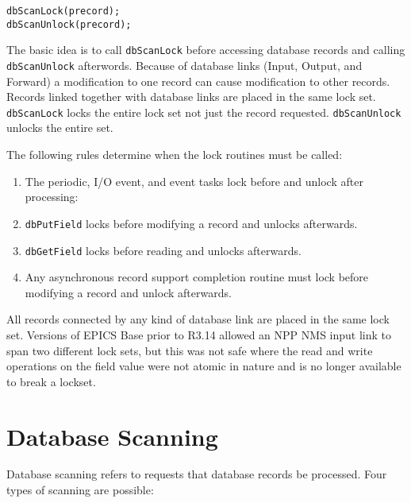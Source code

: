 \begin{verbatim}
dbScanLock(precord);
dbScanUnlock(precord);
\end{verbatim}

The basic idea is to call \verb|dbScanLock| before accessing database records and calling \verb|dbScanUnlock| afterwords. 
Because of database links (Input, Output, and Forward) a modification to one record can cause modification to other 
records. Records linked together with database links are placed in the same lock set. \verb|dbScanLock| locks the entire lock 
set not just the record requested. \verb|dbScanUnlock| unlocks the entire set.

The following rules determine when the lock routines must be called:

\begin{enumerate}
\item The periodic, I/O event, and event tasks lock before and unlock after processing:

\item \verb|dbPutField| locks before modifying a record and unlocks afterwards.

\item \verb|dbGetField| locks before reading and unlocks afterwards.

\item Any asynchronous record support completion routine must lock before modifying a record and unlock afterwards.

\end{enumerate}

All records connected by any kind of database link are placed in the same lock set. Versions of EPICS Base prior to R3.14 
allowed an NPP NMS input link to span two different lock sets, but this was not safe where the read and write operations 
on the field value were not atomic in nature and is no longer available to break a lockset.

\section{Database Scanning}

Database scanning refers to requests that database records be processed. Four types of scanning are possible:

